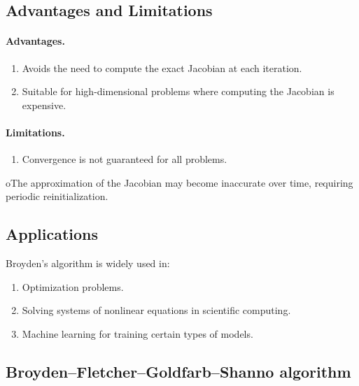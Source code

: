 \documentclass[%
oneside,                 %
final,                   %
10pt]{article}
\begin{document}
\noindent
\subsection*{Advantages and Limitations}


\paragraph{Advantages.}
\begin{enumerate}
\item Avoids the need to compute the exact Jacobian at each iteration.

\item Suitable for high-dimensional problems where computing the Jacobian is expensive.
\end{enumerate}

\noindent




\paragraph{Limitations.}
\begin{enumerate}
\item Convergence is not guaranteed for all problems.
\end{enumerate}

\noindent
oThe approximation of the Jacobian may become inaccurate over time, requiring periodic reinitialization.



\subsection*{Applications}

Broyden’s algorithm is widely used in:
\begin{enumerate}
\item Optimization problems.

\item Solving systems of nonlinear equations in scientific computing.

\item Machine learning for training certain types of models.
\end{enumerate}

\noindent
\subsection*{Broyden–Fletcher–Goldfarb–Shanno algorithm}
\end{document}

